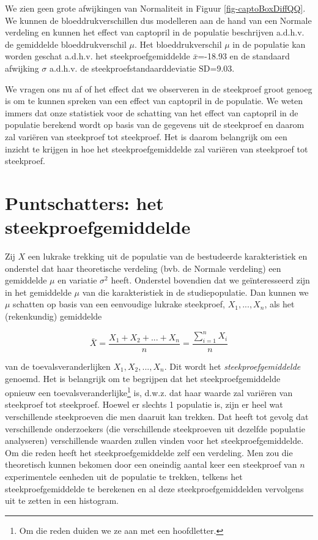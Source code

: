 \documentclass[
  dutch,
  letterpaper,
  12pt]{book}
\theoremstyle{definition}
\theoremstyle{definition}
\theoremstyle{definition}
\theoremstyle{remark}
\begin{document}
We zien geen grote afwijkingen van Normaliteit in Figuur
\ref{fig-captoBoxDiffQQ}. We kunnen de bloeddrukverschillen dus
modelleren aan de hand van een Normale verdeling en kunnen het effect
van captopril in de populatie beschrijven a.d.h.v. de gemiddelde
bloeddrukverschil \(\mu\). Het bloeddrukverschil \(\mu\) in de populatie
kan worden geschat a.d.h.v. het steekproefgemiddelde \(\bar x\)=-18.93
en de standaard afwijking \(\sigma\) a.d.h.v. de
steekproefstandaarddeviatie \(\text{SD}\)=9.03.

We vragen ons nu af of het effect dat we observeren in de steekproef
groot genoeg is om te kunnen spreken van een effect van captopril in de
populatie. We weten immers dat onze statistiek voor de schatting van het
effect van captopril in de populatie berekend wordt op basis van de
gegevens uit de steekproef en daarom zal variëren van steekproef tot
steekproef. Het is daarom belangrijk om een inzicht te krijgen in hoe
het steekproefgemiddelde zal variëren van steekproef tot steekproef.

\section{Puntschatters: het
steekproefgemiddelde}\label{puntschatters-het-steekproefgemiddelde}

Zij \(X\) een lukrake trekking uit de populatie van de bestudeerde
karakteristiek en onderstel dat haar theoretische verdeling (bvb. de
Normale verdeling) een gemiddelde \(\mu\) en variatie \(\sigma^2\)
heeft. Onderstel bovendien dat we geïnteresseerd zijn in het gemiddelde
\(\mu\) van die karakteristiek in de studiepopulatie. Dan kunnen we
\(\mu\) schatten op basis van een eenvoudige lukrake steekproef,
\(X_1,...,X_n\), als het (rekenkundig) gemiddelde

\begin{equation*}
\bar X = \frac{X_1+ X_2+ ... + X_n}{n} = \frac{\sum_{i=1}^{n} X_i}{n}
\end{equation*}

van de toevalsveranderlijken \(X_1,X_2, ..., X_n\). Dit wordt het
\emph{steekproefgemiddelde} genoemd. Het is belangrijk om te begrijpen
dat het steekproefgemiddelde opnieuw een toevalsveranderlijke\footnote{Om
  die reden duiden we ze aan met een hoofdletter.} is, d.w.z. dat haar
waarde zal variëren van steekproef tot steekproef. Hoewel er slechts 1
populatie is, zijn er heel wat verschillende steekproeven die men
daaruit kan trekken. Dat heeft tot gevolg dat verschillende onderzoekers
(die verschillende steekproeven uit dezelfde populatie analyseren)
verschillende waarden zullen vinden voor het steekproefgemiddelde. Om
die reden heeft het steekproefgemiddelde zelf een verdeling. Men zou die
theoretisch kunnen bekomen door een oneindig aantal keer een steekproef
van \(n\) experimentele eenheden uit de populatie te trekken, telkens
het steekproefgemiddelde te berekenen en al deze steekproefgemiddelden
vervolgens uit te zetten in een histogram.
\end{document}
